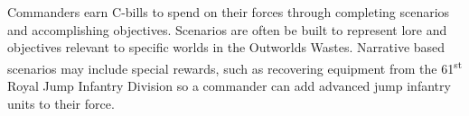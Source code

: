Commanders earn C-bills to spend on their forces through completing scenarios and accomplishing objectives.
Scenarios are often be built to represent lore and objectives relevant to specific worlds in the Outworlds Wastes.
Narrative based scenarios may include special rewards, such as recovering equipment from the 61\textsuperscript{st} Royal Jump Infantry Division so a commander can add advanced jump infantry units to their force.
